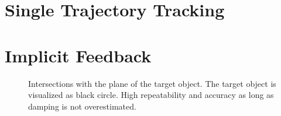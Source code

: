 \section{Single Trajectory Tracking}


\section{Implicit Feedback}






\begin{figure}
	\centering
	
	\caption{Intersections with the plane of the target object. The target object is visualized as black circle. High repeatability and accuracy as long as damping is not overestimated.}
\end{figure}


